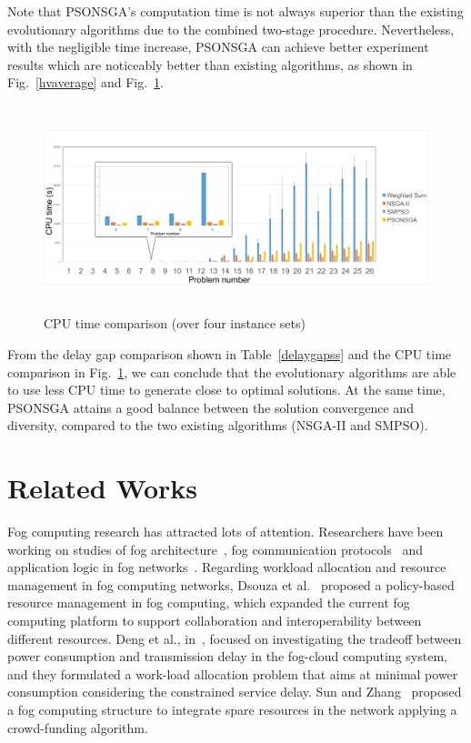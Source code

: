 \documentclass[10pt,journal,compsoc]{IEEEtran}
\newcommand{\Fig}[1]{Fig.~\ref{#1}}
\begin{document}
Note that PSONSGA’s computation time is not always superior than the existing evolutionary algorithms due to the combined two-stage procedure. Nevertheless, with the negligible time increase, PSONSGA can achieve better experiment results which are noticeably better than existing algorithms, as shown in \Fig{hvaverage} and \Fig{cputimeover4}.
\begin{figure}[ht]
\centerline{\includegraphics[page=1,width=\textwidth,height=6cm]{cputimeover4withzoom}}
\caption{CPU time comparison (over four instance sets)} 
\label{cputimeover4}
\end{figure}

From the delay gap comparison shown in Table~\ref{delaygapss} and the CPU time comparison in \Fig{cputimeover4}, we can conclude that the evolutionary algorithms are able to use less CPU time to generate close to optimal solutions. At the same time, PSONSGA attains a good balance between the solution convergence and diversity, compared to the two existing algorithms (NSGA-II and SMPSO).


\section{Related Works}\label{relwork}
Fog computing research has attracted lots of attention. Researchers have been working on studies of fog architecture~\cite{fcsmartcity}, fog communication protocols~\cite{Peng:2016:FRA:3029494.3029575} and application logic in fog networks~\cite{SUN2017687}. Regarding workload allocation and resource management in fog computing networks, Dsouza et al.~\cite{secme} proposed a policy-based resource management in fog computing, which expanded the current fog computing platform to support collaboration and interoperability between different resources. Deng et al., in~\cite{fcworkload}, focused on investigating the tradeoff between power consumption and transmission delay in the fog-cloud computing system, and they formulated a work-load allocation problem that aims at minimal power consumption considering the constrained service delay. Sun and Zhang~\cite{SUN2017687} proposed a fog computing structure to integrate spare resources in the network applying a crowd-funding algorithm.
\end{document}

